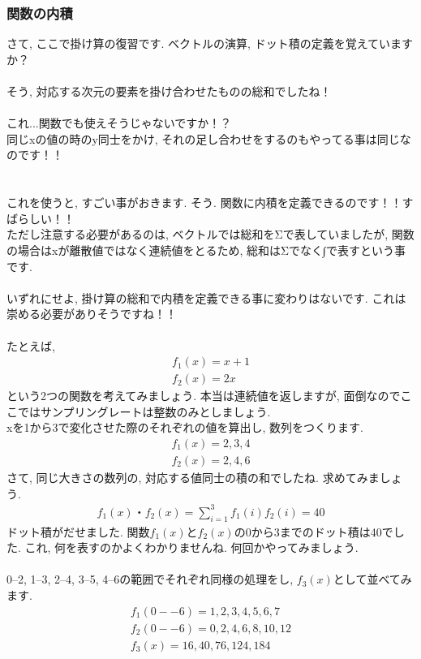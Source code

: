 \documentclass[11pt,a4paper]{jsarticle}
\begin{document}
\subsubsection{関数の内積}
さて, ここで掛け算の復習です. ベクトルの演算, ドット積の定義を覚えていますか？\\
\\
そう, 対応する次元の要素を掛け合わせたものの総和でしたね！\\
\\
これ...関数でも使えそうじゃないですか！？\\
同じxの値の時のy同士をかけ, それの足し合わせをするのもやってる事は同じなのです！！\\
\\
\\
これを使うと, すごい事がおきます. そう. 関数に内積を定義できるのです！！すばらしい！！\\
ただし注意する必要があるのは, ベクトルでは総和をΣで表していましたが, 関数の場合はxが離散値ではなく連続値をとるため, 総和はΣでなく∫で表すという事です.\\
\\
いずれにせよ, 掛け算の総和で内積を定義できる事に変わりはないです. これは崇める必要がありそうですね！！\\
\\
たとえば, 
\begin{eqnarray}
f_1(x) = x + 1\\
f_2(x) = 2x 
\end{eqnarray}
という2つの関数を考えてみましょう. 本当は連続値を返しますが, 面倒なのでここではサンプリングレートは整数のみとしましょう.\\
xを1から3で変化させた際のそれぞれの値を算出し, 数列をつくります.
\begin{eqnarray}
{f_1(x)} = {2,3,4}\\
{f_2(x) } = {2,4,6}
\end{eqnarray}
さて, 同じ大きさの数列の, 対応する値同士の積の和でしたね. 求めてみましょう.\\
\begin{eqnarray}
f_1(x)・f_2(x) = \sum_{i=1}^{3} f_1(i)f_2(i) =40
\end{eqnarray}
ドット積がだせました. 関数$f_1(x)$と$f_2(x)$の0から3までのドット積は40でした. これ, 何を表すのかよくわかりませんね. 何回かやってみましょう.\\
\\
0--2, 1--3, 2--4, 3--5, 4--6の範囲でそれぞれ同様の処理をし, $f_3(x)$として並べてみます.\\
\begin{eqnarray}
f_1(0--6) = 1,2,3,4,5,6,7\\
f_2(0--6) = 0,2,4,6,8,10,12\\
f_3(x) = 16,40,76, 124, 184
\label{eq:3}
\end{eqnarray}
\end{document}
